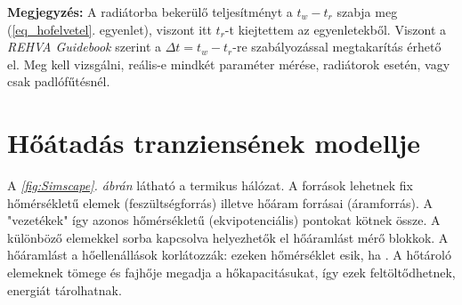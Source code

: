 \begin{formal}
	\textbf{Megjegyzés:} A radiátorba bekerülő teljesítményt a $t_w-t_r$ szabja meg (\ref{eq_hofelvetel}. egyenlet), viszont itt $t_r$-t kiejtettem az egyenletekből. Viszont a \textit{REHVA Guidebook}
	\cite{RehvaGuidebookNo7} szerint a $\Delta t= t_w-t_r$-re szabályozással megtakarítás érhető el. Meg kell vizsgálni, reális-e mindkét paraméter mérése, radiátorok esetén, vagy csak padlófűtésnél.
\end{formal}

%




\section{Hőátadás tranziensének modellje}\label{section:dinamikus}

A \textit{\ref{fig:Simscape}. ábrán} látható a termikus hálózat. A források lehetnek fix hőmérsékletű elemek (feszültségforrás) illetve hőáram forrásai (áramforrás). A "vezetékek" így azonos hőmérsékletű (ekvipotenciális) pontokat kötnek össze. A különböző elemekkel sorba kapcsolva helyezhetők el hőáramlást mérő blokkok. A hőáramlást a hőellenállások korlátozzák: ezeken hőmérséklet esik, ha . A hőtároló elemeknek tömege és fajhője megadja a hőkapacitásukat, így ezek feltöltődhetnek, energiát tárolhatnak.

